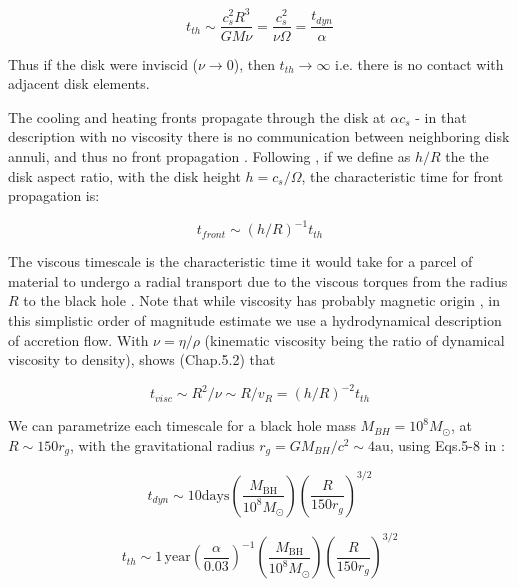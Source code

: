 \documentclass[twocolumn]{aastex62}
\begin{document}
\begin{equation}
t_{th} {\sim} \frac{c_{s}^{2}R^{3}}{G M \nu } = \frac{c_{s}^{2}}{\nu \Omega} = \frac{t_{dyn}}{\alpha}
\end{equation}

Thus if the disk were inviscid ($\nu \rightarrow 0$), then $t_{th}\rightarrow\infty$ i.e. there is no contact with adjacent disk elements. 

The cooling and heating fronts propagate through the disk at  $\alpha c_{s} $ \citep{hameury2009}  - in that description  with no viscosity there is no communication between neighboring disk annuli, and thus no front propagation \citep{balbus1998, balbus2003}. Following \cite{stern2018}, if we define as $h/R$  the the disk aspect ratio, with the disk height $h = c_{s} / \Omega$, the characteristic time for front propagation is:

\begin{equation}
t_{front} {\sim} (h/R) ^ {-1} t_{th}
\end{equation}


The viscous timescale is the characteristic time it would take for a parcel of material to undergo a radial transport due to the viscous torques from the radius $R$ to the black hole \citep{czerny2006}. Note that while viscosity has probably magnetic origin \citep{eardley1975, grzedzielski2017}, in this simplistic order of magnitude estimate we use a hydrodynamical description of accretion flow.  With $\nu = \eta / \rho$ (kinematic viscosity being the ratio of dynamical viscosity to density), \cite{frank2002} shows (Chap.5.2) that 

\begin{equation}
t_{visc} {\sim} R^{2} / \nu {\sim}  R / v_{R} = (h/R)^{-2} t_{th}
\end{equation}

 We can parametrize each timescale for a black hole mass $M_{BH} = 10^{8} M_{\odot}$, at $R {\sim} 150 r_{g}$, with the gravitational radius $r_{g} = GM_{BH} / c^{2} {\sim} 4 \mathrm{au}$, using Eqs.5-8 in \cite{stern2018} : 


 \begin{equation}
 t_{dyn} {\sim} 10  \mathrm{days} \left(\frac{M_{\mathrm{BH}}}{10^{8} M_{\odot}} \right) 
 \left( \frac{R}{150 r_{g}}\right) ^{3/2} 
 \end{equation}

 \begin{equation}
 t_{th}   {\sim} 1 \,\mathrm{year} \left( \frac{\alpha}{0.03}\right)^{-1}  
 \left( \frac{M_{\mathrm{BH}}}{10^{8} M_{\odot}}\right) \left( \frac{R}{150 r_{g}}\right)^{3/2} 
 \end{equation}
\end{document}
